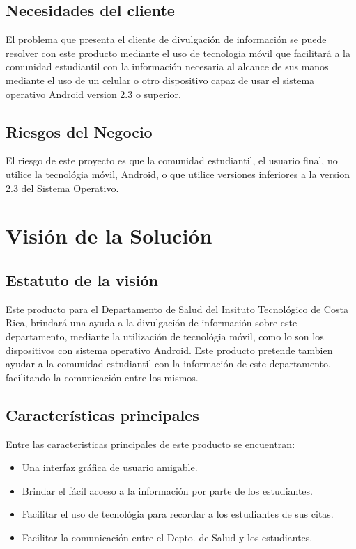 \documentclass[12pt]{article}
\begin{document}
\subsection{Necesidades del cliente}

El problema que presenta el cliente de divulgaci\'on de informaci\'on se puede resolver con este producto mediante el uso de tecnologia m\'ovil que facilitar\'a a la comunidad estudiantil con la informaci\'on necesaria al alcance de sus manos mediante el uso de un celular o otro dispositivo capaz de usar el sistema operativo Android version 2.3 o superior.

\subsection{Riesgos del Negocio}

El riesgo de este proyecto es que la comunidad estudiantil, el usuario final, no utilice la tecnol\'ogia m\'ovil, Android, o que utilice versiones inferiores a la version 2.3 del Sistema Operativo.

\newpage
\section{Visi\'on de la Soluci\'on}

\subsection{Estatuto de la visi\'on}

Este producto para el Departamento de Salud del Insituto Tecnol\'ogico de Costa Rica, brindar\'a una ayuda a la divulgaci\'on de informaci\'on sobre este departamento, mediante la utilizaci\'on de tecnol\'ogia m\'ovil, como lo son los dispositivos con sistema operativo Android. Este producto pretende tambien ayudar a la comunidad estudiantil con la informaci\'on de este departamento, facilitando la comunicaci\'on entre los mismos.

\subsection{Características principales}

Entre las caracteristicas principales de este producto se encuentran:
\begin{itemize}
	\item{Una interfaz gr\'afica de usuario amigable.}
	\item{Brindar el f\'acil acceso a la informaci\'on por parte de los estudiantes.}
	\item{Facilitar el uso de tecnol\'ogia para recordar a los estudiantes de sus citas.}
	\item{Facilitar la comunicaci\'on entre el Depto. de Salud y los estudiantes.}
\end{itemize}
\end{document}
